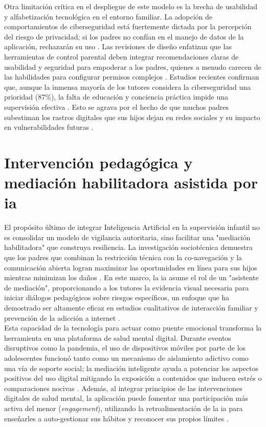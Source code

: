 Otra limitación crítica en el despliegue de este modelo es la brecha de usabilidad y alfabetización tecnológica en el entorno familiar. La adopción de comportamientos de ciberseguridad está fuertemente dictada por la percepción del riesgo de privacidad; si los padres no confían en el manejo de datos de la aplicación, rechazarán su uso \cite{balapour_mobile_2020}. Las revisiones de diseño enfatizan que las herramientas de control parental deben integrar recomendaciones claras de usabilidad y seguridad para empoderar a los padres, quienes a menudo carecen de las habilidades para configurar permisos complejos \cite{gnanasekaran_usability_2023}. Estudios recientes confirman que, aunque la inmensa mayoría de los tutores considera la ciberseguridad una prioridad (87\%), la falta de educación y conciencia práctica impide una supervisión efectiva \cite{ayyash_cybersecurity_2024}. Esto se agrava por el hecho de que muchos padres subestiman los rastros digitales que sus hijos dejan en redes sociales y su impacto en vulnerabilidades futuras \cite{chang_cybersecurity_2023}.\\

\section{Intervención pedagógica y mediación habilitadora asistida por \gls{ia}}

El propósito último de integrar Inteligencia Artificial en la supervisión infantil no es consolidar un modelo de vigilancia autoritaria, sino facilitar una "mediación habilitadora" que construya resiliencia. La investigación sociotécnica demuestra que los padres que combinan la restricción técnica con la co-navegación y la comunicación abierta logran maximizar las oportunidades en línea para sus hijos mientras minimizan los daños \cite{livingstone_maximizing_2017}. En este marco, la \gls{ia} asume el rol de un "asistente de mediación", proporcionando a los tutores la evidencia visual necesaria para iniciar diálogos pedagógicos sobre riesgos específicos, un enfoque que ha demostrado ser altamente eficaz en estudios cualitativos de interacción familiar y prevención de la adicción a internet \cite{theopilus_parental_2025, allison_parental_2025}.\\

Esta capacidad de la tecnología para actuar como puente emocional transforma la herramienta en una plataforma de salud mental digital. Durante eventos disruptivos como la pandemia, el uso de dispositivos móviles por parte de los adolescentes funcionó tanto como un mecanismo de aislamiento adictivo como una vía de soporte social; la mediación inteligente ayuda a potenciar los aspectos positivos del uso digital mitigando la exposición a contenidos que inducen estrés o comparaciones nocivas \cite{marciano_digital_2022}. Además, al integrar principios de las intervenciones digitales de salud mental, la aplicación puede fomentar una participación más activa del menor (\textit{engagement}), utilizando la retroalimentación de la \gls{ia} para enseñarles a auto-gestionar sus hábitos y reconocer sus propios límites \cite{liverpool_engaging_2020}.\\


